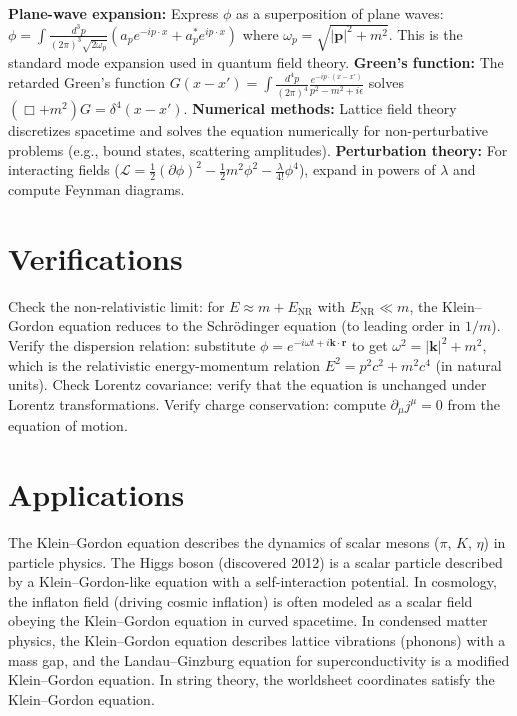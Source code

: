 \textbf{Plane-wave expansion:} Express $\phi$ as a superposition of plane waves: $\phi = \int \frac{d^3p}{(2\pi)^3\sqrt{2\omega_p}}(a_p e^{-ip\cdot x} + a_p^* e^{ip\cdot x})$ where $\omega_p = \sqrt{|\mathbf{p}|^2 + m^2}$. This is the standard mode expansion used in quantum field theory. \textbf{Green's function:} The retarded Green's function $G(x - x') = \int \frac{d^4p}{(2\pi)^4}\frac{e^{-ip\cdot(x-x')}}{p^2 - m^2 + i\epsilon}$ solves $(\Box + m^2)G = \delta^4(x - x')$. \textbf{Numerical methods:} Lattice field theory discretizes spacetime and solves the equation numerically for non-perturbative problems (e.g., bound states, scattering amplitudes). \textbf{Perturbation theory:} For interacting fields ($\mathcal{L} = \frac{1}{2}(\partial\phi)^2 - \frac{1}{2}m^2\phi^2 - \frac{\lambda}{4!}\phi^4$), expand in powers of $\lambda$ and compute Feynman diagrams.
\section*{Verifications}

Check the non-relativistic limit: for $E \approx m + E_{\text{NR}}$ with $E_{\text{NR}} \ll m$, the Klein--Gordon equation reduces to the Schr\"odinger equation (to leading order in $1/m$). Verify the dispersion relation: substitute $\phi = e^{-i\omega t + i\mathbf{k}\cdot\mathbf{r}}$ to get $\omega^2 = |\mathbf{k}|^2 + m^2$, which is the relativistic energy-momentum relation $E^2 = p^2c^2 + m^2c^4$ (in natural units). Check Lorentz covariance: verify that the equation is unchanged under Lorentz transformations. Verify charge conservation: compute $\partial_\mu j^\mu = 0$ from the equation of motion.
\section*{Applications}

The Klein--Gordon equation describes the dynamics of scalar mesons ($\pi$, $K$, $\eta$) in particle physics. The Higgs boson (discovered 2012) is a scalar particle described by a Klein--Gordon-like equation with a self-interaction potential. In cosmology, the inflaton field (driving cosmic inflation) is often modeled as a scalar field obeying the Klein--Gordon equation in curved spacetime. In condensed matter physics, the Klein--Gordon equation describes lattice vibrations (phonons) with a mass gap, and the Landau--Ginzburg equation for superconductivity is a modified Klein--Gordon equation. In string theory, the worldsheet coordinates satisfy the Klein--Gordon equation.
